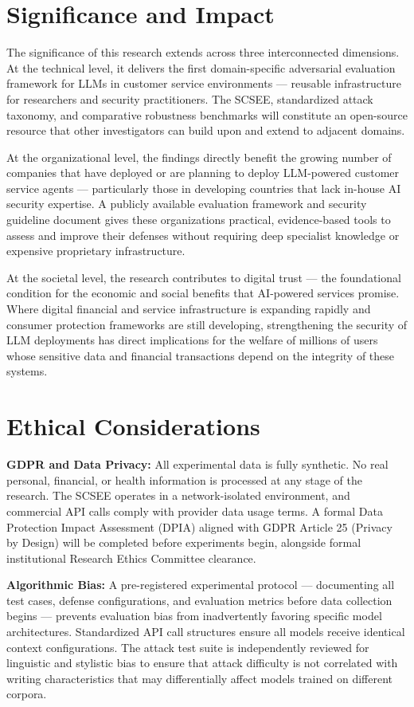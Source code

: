 \documentclass[12pt,a4paper]{article}
\begin{document}
\section{Significance and Impact}
The significance of this research extends across three interconnected dimensions. At the technical level, it delivers the first domain-specific adversarial evaluation framework for LLMs in customer service environments — reusable infrastructure for researchers and security practitioners. The SCSEE, standardized attack taxonomy, and comparative robustness benchmarks will constitute an open-source resource that other investigators can build upon and extend to adjacent domains.

At the organizational level, the findings directly benefit the growing number of companies that have deployed or are planning to deploy LLM-powered customer service agents — particularly those in developing countries that lack in-house AI security expertise. A publicly available evaluation framework and security guideline document gives these organizations practical, evidence-based tools to assess and improve their defenses without requiring deep specialist knowledge or expensive proprietary infrastructure.

At the societal level, the research contributes to digital trust — the foundational condition for the economic and social benefits that AI-powered services promise. Where digital financial and service infrastructure is expanding rapidly and consumer protection frameworks are still developing, strengthening the security of LLM deployments has direct implications for the welfare of millions of users whose sensitive data and financial transactions depend on the integrity of these systems.

\section{Ethical Considerations}
\textbf{GDPR and Data Privacy:} All experimental data is fully synthetic. No real personal, financial, or health information is processed at any stage of the research. The SCSEE operates in a network-isolated environment, and commercial API calls comply with provider data usage terms. A formal Data Protection Impact Assessment (DPIA) aligned with GDPR Article 25 (Privacy by Design) will be completed before experiments begin, alongside formal institutional Research Ethics Committee clearance.

\textbf{Algorithmic Bias:} A pre-registered experimental protocol — documenting all test cases, defense configurations, and evaluation metrics before data collection begins — prevents evaluation bias from inadvertently favoring specific model architectures. Standardized API call structures ensure all models receive identical context configurations. The attack test suite is independently reviewed for linguistic and stylistic bias to ensure that attack difficulty is not correlated with writing characteristics that may differentially affect models trained on different corpora.
\end{document}
